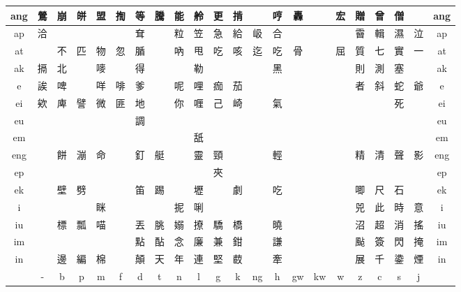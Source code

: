 \documentclass{article}
\begin{document}
\begin{adjustbox}{width=\textwidth, totalheight=\baselineskip,keepaspectratio}
\begin{tabular}{|>{\columncolor{mygray}}c|c|@{\hspace{1pt}}*{19}{c|@{\hspace{1pt}}} >{\columncolor{mygray}}c|}
	\hline
	ang & 鶯 & 崩 & 皏 & 盟 & 揈 & 等 & 騰 & 能 & 舲 & 更 & 掯 &  & 哼 & 轟 &  & 宏 & 贈 & 曾 & 僧 &  & ang \\
	\hline
	ap & 洽 &  &  &  &  & 耷 &  & 粒 & 笠 & 急 & 給 & 岋 & 合 &  &  &  & 霫 & 輯 & 濕 & 泣 & ap \\
	\hline
	at &  & 不 & 匹 & 物 & 忽 & 腯 &  & 吶 & 甩 & 吃 & 咳 & 迄 & 吃 & 骨 &  & 屈 & 質 & 七 & 實 & 一 & at \\
	\hline
	ak & 搹 & 北 &  & 嘜 &  & 得 &  &  & 勒 &  &  &  & 黑 &  &  &  & 則 & 測 & 塞 &  & ak \\
	\hline
	e & 誒 & 啤 &  & 咩 & 啡 & 爹 &  & 呢 & 哩 & 痂 & 茄 &  &  &  &  &  & 者 & 斜 & 蛇 & 爺 & e \\
	\hline
	ei & 欸 & 庳 & 譬 & 微 & 匪 & 地 &  & 你 & 喱 & 己 & 崎 &  & 氣 &  &  &  &  &  & 死 &  & ei \\
	\hline
	eu &  &  &  &  &  & 調 &  &  &  &  &  &  &  &  &  &  &  &  &  &  & eu \\
	\hline
	em &  &  &  &  &  &  &  &  & 舐 &  &  &  &  &  &  &  &  &  &  &  & em \\
	\hline
	eng &  & 餅 & 漰 & 命 &  & 釘 & 艇 &  & 靈 & 頸 &  &  & 輕 &  &  &  & 精 & 清 & 聲 & 影 & eng \\
	\hline
	ep &  &  &  &  &  &  &  &  &  & 夾 &  &  &  &  &  &  &  &  &  &  & ep \\
	\hline
	ek &  & 壁 & 劈 &  &  & 笛 & 踢 &  & 壢 &  & 劇 &  & 吃 &  &  &  & 唧 & 尺 & 石 &  & ek \\
	\hline
	i &  &  &  & 眯 &  &  &  & 抳 & 唎 &  &  &  &  &  &  &  & 兕 & 此 & 時 & 意 & i \\
	\hline
	iu &  & 標 & 瓢 & 喵 &  & 丟 & 朓 & 嫋 & 撩 & 驕 & 橋 &  & 曉 &  &  &  & 沼 & 超 & 消 & 搖 & iu \\
	\hline
	im &  &  &  &  &  & 點 & 酟 & 念 & 廉 & 兼 & 鉗 &  & 謙 &  &  &  & 颭 & 簽 & 閃 & 掩 & im \\
	\hline
	in &  & 邊 & 編 & 棉 &  & 顛 & 天 & 年 & 連 & 堅 & 菣 &  & 牽 &  &  &  & 展 & 千 & 鍌 & 煙 & in \\
	\hline
	\rowcolor{mygray} & - & b & p & m & f & d & t & n & l & g & k & ng & h & gw & kw & w & z & c & s & j &  \\
	\hline
\end{tabular}


\end{adjustbox}

\newpage
\end{document}
